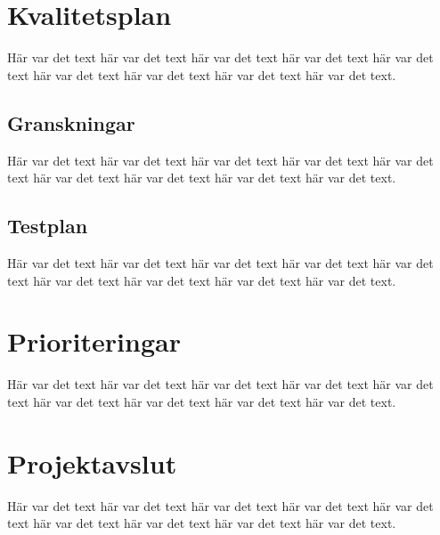 \documentclass[a4paper,titlepage,12pt]{article}
\begin{document}
	
	\section{Kvalitetsplan}
	Här var det text här var det text här var det text
	här var det text här var det text här var det text
	här var det text här var det text här var det text.
	
	
	\subsection{Granskningar}
	Här var det text här var det text här var det text
	här var det text här var det text här var det text
	här var det text här var det text här var det text.
	
	
	\subsection{Testplan}
	Här var det text här var det text här var det text
	här var det text här var det text här var det text
	här var det text här var det text här var det text.
	
	
	
	
	\section{Prioriteringar}
	Här var det text här var det text här var det text
	här var det text här var det text här var det text
	här var det text här var det text här var det text.
	
	
	\section{Projektavslut}
	Här var det text här var det text här var det text
	här var det text här var det text här var det text
	här var det text här var det text här var det text.
\end{document}
